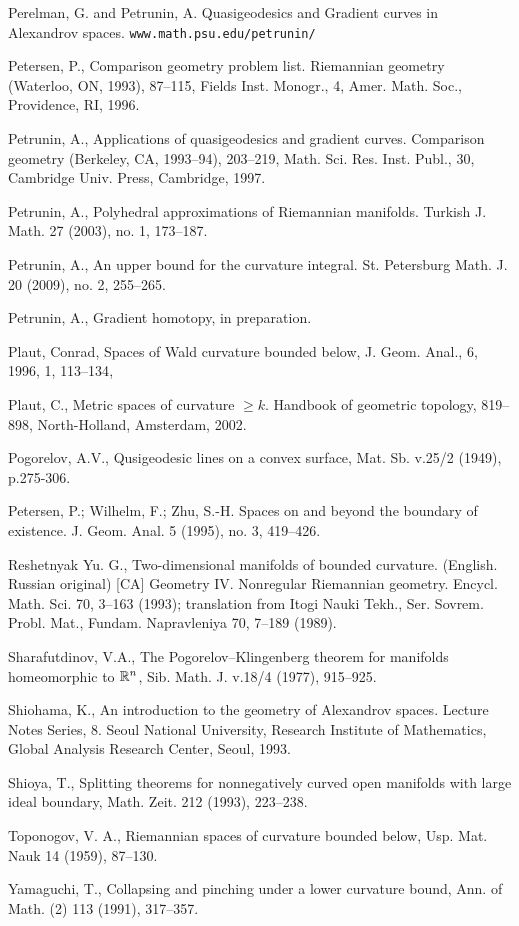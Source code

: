 \documentclass{article}
\begin{document}
\begin{thebibliography}{Bibliography}
Perelman, G. and  Petrunin, A. Quasigeodesics and Gradient curves in Alexandrov spaces. {\tt www.math.psu.edu/petrunin/}

Petersen, P.,
Comparison geometry problem list. 
Riemannian geometry (Waterloo, ON, 1993), 87--115,
Fields Inst. Monogr., 4, Amer. Math. Soc., Providence, RI, 1996. 

Petrunin, A., 
Applications of quasigeodesics and gradient curves.  
Comparison geometry (Berkeley, CA, 1993--94),  203--219,
Math. Sci. Res. Inst. Publ., 30, Cambridge Univ. Press, Cambridge, 1997.

Petrunin, A.,
Polyhedral approximations of Riemannian manifolds.  
Turkish J. Math.  27  (2003),  no. 1, 173--187.

Petrunin, A., 
An upper bound for the curvature integral. 
St. Petersburg Math. J. 20 (2009), no. 2, 255--265.

Petrunin, A., 
Gradient homotopy, 
in preparation.

 {Plaut, Conrad},
      {Spaces of Wald curvature bounded below},
    {J. Geom. Anal.},
     {6},
     {1996},
     {1},
      {113--134},

Plaut, C., 
Metric spaces of curvature $\ge k$. 
Handbook of geometric topology,  
819--898, North-Holland, Amsterdam, 2002.

 Pogorelov, A.V., 
Qusigeodesic lines on a convex surface, Mat. Sb. v.25/2
(1949), p.275-306.

Petersen, P.; Wilhelm, F.;
Zhu, S.-H.
Spaces on and beyond the boundary of existence. 
J. Geom. Anal. 5 (1995), no. 3, 419--426.

Reshetnyak Yu. G., Two-dimensional manifolds of bounded curvature. (English. Russian
original) [CA] Geometry IV. Nonregular Riemannian geometry. Encycl. Math. Sci. 70,
3--163 (1993); translation from Itogi Nauki Tekh., Ser. Sovrem. Probl. Mat., Fundam.
Napravleniya 70, 7--189 (1989).

Sharafutdinov, V.A., 
The Pogorelov--Klingenberg
theorem for manifolds homeomorphic to $\mathbb{R}^n$, Sib. Math. J. v.18/4 (1977),
915--925.

Shiohama, K., 
An introduction to the geometry of
Alexandrov spaces. 
Lecture Notes Series, 8. Seoul National University, Research
Institute of Mathematics, Global Analysis Research Center, Seoul, 1993.

  Shioya, T., 
Splitting theorems for nonnegatively curved open manifolds
with large ideal boundary, Math. Zeit. 212 (1993), 223--238.

Toponogov, V. A.,
Riemannian spaces of curvature bounded below,
Usp. Mat. Nauk 14 (1959), 87--130.

 Yamaguchi, T., 
Collapsing and pinching under a lower curvature
bound, Ann. of Math. (2) 113 (1991), 317--357.
\end{thebibliography}
\end{document}
